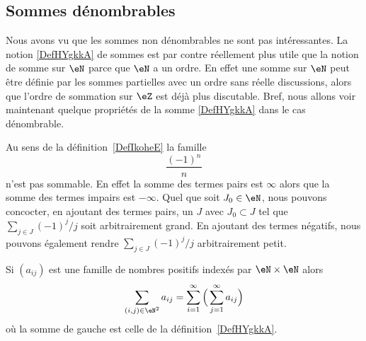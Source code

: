 \subsection{Sommes dénombrables}

Nous avons vu que les sommes non dénombrables ne sont pas intéressantes. La notion \ref{DefHYgkkA} de sommes est par contre réellement plus utile que la notion de somme sur \( \eN\) parce que \( \eN\) a un ordre. En effet une somme sur \( \eN\) peut être définie par les sommes partielles avec un ordre sans réelle discussions, alors que l'ordre de sommation sur \( \eZ\) est déjà plus discutable. Bref, nous allons voir maintenant quelque propriétés de la somme \ref{DefHYgkkA} dans le cas dénombrable.

\begin{example}     \label{EXooULLXooTDFYqf}
    Au sens de la définition~\ref{DefIkoheE} la famille
    \begin{equation}
        \frac{ (-1)^n }{ n }
    \end{equation}
    n'est pas sommable. En effet la somme des termes pairs est \( \infty\) alors que la somme des termes impairs est \( -\infty\). Quel que soit \( J_0\in \eN\), nous pouvons concocter, en ajoutant des termes pairs, un \( J\) avec \( J_0\subset J\) tel que \( \sum_{j\in J}(-1)^j/j\) soit arbitrairement grand. En ajoutant des termes négatifs, nous pouvons également rendre \( \sum_{j\in J}(-1)^j/j\) arbitrairement petit.
\end{example}

\begin{proposition} \label{PropVQCooYiWTs}
    Si \( (a_{ij})\) est une famille de nombres positifs indexés par \( \eN\times \eN\) alors
    \begin{equation}
        \sum_{(i,j)\in \eN^2}a_{ij}=\sum_{i=1}^{\infty}\Big( \sum_{j=1}^{\infty}a_{ij} \Big)
    \end{equation}
    où la somme de gauche est celle de la définition~\ref{DefHYgkkA}.
\end{proposition}


